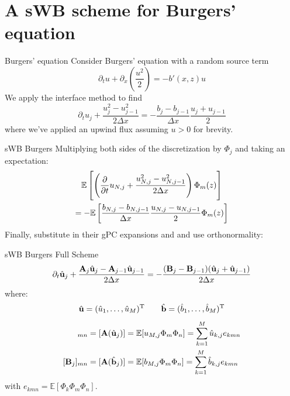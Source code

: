 \documentclass[
    pdf,
    11pt,
    xcolor={svgnames},
  ]{beamer}
\begin{document}
\section{A sWB scheme for Burgers' equation}

\begin{frame}{Burgers' equation}
    Consider Burgers' equation with a random source term
    \begin{equation} \label{eq:sburgers}
        \partial_t u + \partial_x \left( \frac{u^2}{2} \right) = -b'(x,z) u
    \end{equation}
    \pause
    We apply the interface method to find
    \begin{equation} \label{eq:burgers_inteface}
        \partial_t u_j + \frac{u_j^2 - u_{j-1}^2}{2 \Delta x} = -\frac{b_j - b_{j-1}}{\Delta x} \frac{u_j + u_{j-1}}{2}
    \end{equation}
    where we've applied an upwind flux assuming $u > 0$ for brevity.
\end{frame}

\begin{frame}{sWB Burgers}
    Multiplying both sides of the discretization by $\Phi_j$ and taking an expectation:
    \begin{multline*}
        \mathbb{E}\left[
            \left(
                \pdv{}{t} u_{N,j} + \frac{u_{N,j}^2-u_{N,j-1}^2}{2\Delta x}
            \right) \Phi_m(z)
        \right] \\
        = -\mathbb{E} \left[
            \frac{b_{N,j} - b_{N,j-1}}{\Delta x} \frac{u_{N,j} - u_{N,j-1}}{2} \Phi_m(z)
        \right]
    \end{multline*}
    Finally, substitute in their gPC expansions and and use orthonormality:
\end{frame}

\begin{frame}{sWB Burgers Full Scheme}
   \begin{equation}
       \partial_t \hat{\vb{u}}_j + \frac{\vb{A}_j \hat{\vb{u}}_j - \vb{A}_{j-1} \hat{\vb{u}}_{j-1}}{2\Delta x} = -\frac{(\vb{B}_j - \vb{B}_{j-1})(\hat{\vb{u}}_j + \hat{\vb{u}}_{j-1})}{2\Delta x}
   \end{equation} 
   where:
   \begin{equation*}
       \hat{\vb{u}} = (\hat{u}_1, \dots, \hat{u}_M)^\mathrm{T}
       \qquad
       \hat{\vb{b}} = (\hat{b}_1, \dots, \hat{b}_M)^\mathrm{T}
   \end{equation*}
   \begin{align*}
       [\vb{A}_j]_{mn} = [\vb{A}(\hat{\vb{u}}_j)] &= \mathbb{E}[u_{M,j} \Phi_m \Phi_n] = \sum_{k=1}^M \hat{u}_{k,j} e_{kmn} \\
       [\vb{B}_j]_{mn} = [\vb{A}(\hat{\vb{b}}_j)] &= \mathbb{E}[b_{M,j} \Phi_m \Phi_n] = \sum_{k=1}^M \hat{b}_{k,j} e_{kmn}
   \end{align*}
   with $e_{kmn} = \mathbb{E}[\Phi_k \Phi_m \Phi_n]$.
\end{frame}
\end{document}
